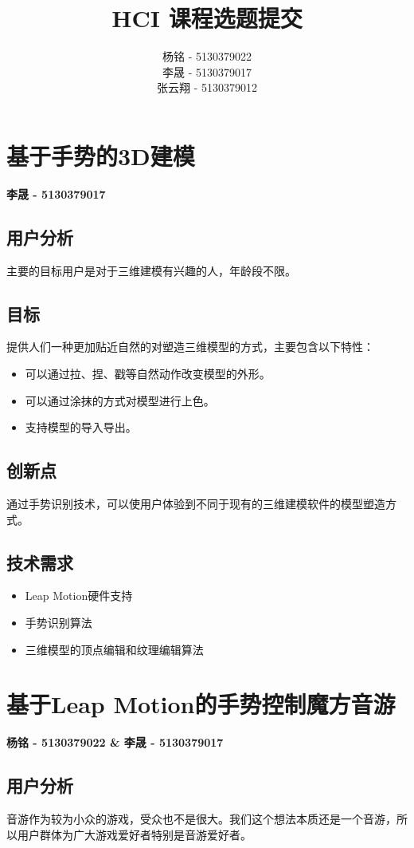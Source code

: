 \documentclass{article} \usepackage{CJK}
\author{杨铭 - 5130379022\\
        李晟 - 5130379017\\
        张云翔 - 5130379012}
\title{HCI 课程选题提交}
\begin{document}
\maketitle
\newpage
\section{基于手势的3D建模}
\textbf{李晟 - 5130379017}
\subsection{用户分析}
主要的目标用户是对于三维建模有兴趣的人，年龄段不限。
\subsection{目标}
提供人们一种更加贴近自然的对塑造三维模型的方式，主要包含以下特性：
\begin{itemize}
	\item 可以通过拉、捏、戳等自然动作改变模型的外形。
	\item 可以通过涂抹的方式对模型进行上色。
	\item 支持模型的导入导出。
\end{itemize}
\subsection{创新点}
通过手势识别技术，可以使用户体验到不同于现有的三维建模软件的模型塑造方式。
\subsection{技术需求}
\begin{itemize}
	\item Leap Motion硬件支持
	\item 手势识别算法
	\item 三维模型的顶点编辑和纹理编辑算法
\end{itemize}
\newpage
\section{基于Leap Motion的手势控制魔方音游}
\textbf{杨铭 - 5130379022 \& 李晟 - 5130379017}
\subsection{用户分析}
音游作为较为小众的游戏，受众也不是很大。我们这个想法本质还是一个音游，所以用户群体为广大游戏爱好者特别是音游爱好者。
\end{document}
